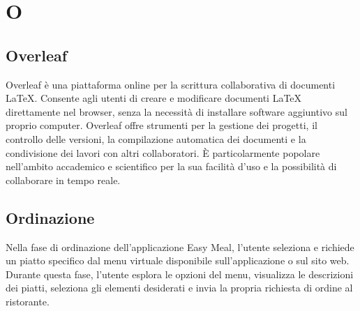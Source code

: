 \section{O} 
\subsection{Overleaf} 
Overleaf è una piattaforma online per la scrittura collaborativa di documenti LaTeX. Consente agli utenti di creare e modificare documenti LaTeX direttamente nel browser, senza la necessità di installare software aggiuntivo sul proprio computer. Overleaf offre strumenti per la gestione dei progetti, il controllo delle versioni, la compilazione automatica dei documenti e la condivisione dei lavori con altri collaboratori. È particolarmente popolare nell'ambito accademico e scientifico per la sua facilità d'uso e la possibilità di collaborare in tempo reale. 
\subsection{Ordinazione} 
Nella fase di ordinazione dell'applicazione Easy Meal, l'utente seleziona e richiede un piatto specifico dal menu virtuale disponibile sull'applicazione o sul sito web. Durante questa fase, l'utente esplora le opzioni del menu, visualizza le descrizioni dei piatti, seleziona gli elementi desiderati e invia la propria richiesta di ordine al ristorante. 
